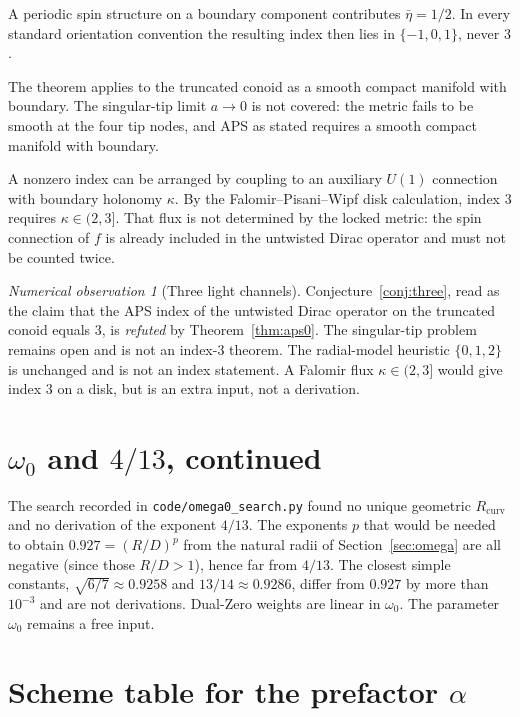 \documentclass[11pt,a4paper]{article}
\theoremstyle{definition}
\theoremstyle{remark}
\newtheorem{numobs}[theorem]{Numerical observation}
\begin{document}
A periodic spin structure on a boundary component contributes
$\bar\eta=1/2$. In every standard orientation convention the resulting
index then lies in $\{-1,0,1\}$, never $3$.

The theorem applies to the truncated conoid as a smooth compact manifold
with boundary. The singular-tip limit $a\to 0$ is not covered: the
metric fails to be smooth at the four tip nodes, and APS as stated
requires a smooth compact manifold with boundary.

A nonzero index can be arranged by coupling to an auxiliary $U(1)$
connection with boundary holonomy $\kappa$. By the Falomir--Pisani--Wipf
disk calculation, index $3$ requires $\kappa\in(2,3]$. That flux is not
determined by the locked metric: the spin connection of $f$ is already
included in the untwisted Dirac operator and must not be counted twice.

\begin{numobs}[Three light channels]
Conjecture~\ref{conj:three}, read as the claim that the APS index of the
untwisted Dirac operator on the truncated conoid equals $3$, is
\emph{refuted} by Theorem~\ref{thm:aps0}. The singular-tip problem
remains open and is not an index-$3$ theorem. The radial-model heuristic
$\{0,1,2\}$ is unchanged and is not an index statement. A Falomir flux
$\kappa\in(2,3]$ would give index $3$ on a disk, but is an extra input,
not a derivation.
\end{numobs}

\section{$\omega_0$ and $4/13$, continued}

The search recorded in \texttt{code/omega0\_search.py} found no unique
geometric $R_{\mathrm{curv}}$ and no derivation of the exponent $4/13$.
The exponents $p$ that would be needed to obtain $0.927=(R/D)^p$ from the
natural radii of Section~\ref{sec:omega} are all negative (since those
$R/D>1$), hence far from $4/13$. The closest simple constants,
$\sqrt{6/7}\approx 0.9258$ and $13/14\approx 0.9286$, differ from $0.927$
by more than $10^{-3}$ and are not derivations. Dual-Zero weights are
linear in $\omega_0$. The parameter $\omega_0$ remains a free input.

\section{Scheme table for the prefactor $\alpha$}
\label{sec:alpha}
\end{document}
